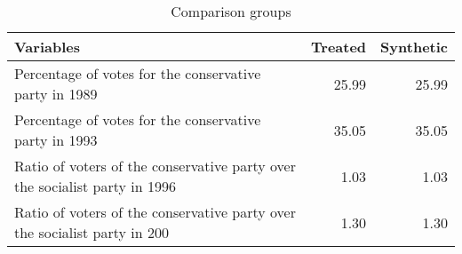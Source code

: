 \begin{table}[ht]
\centering
\begin{tabular}{lrr}
  \hline
Variables & Treated & Synthetic \\ 
  \hline
Percentage of votes for the conservative party in 1989 & 25.99 & 25.99 \\ 
  Percentage of votes for the conservative party in 1993 & 35.05 & 35.05 \\ 
  Ratio of voters of the conservative party over the socialist party in 1996 & 1.03 & 1.03 \\ 
  Ratio of voters of the conservative party over the socialist party in 200 & 1.30 & 1.30 \\ 
   \hline
\end{tabular}
\caption{Comparison groups} 
\end{table}
